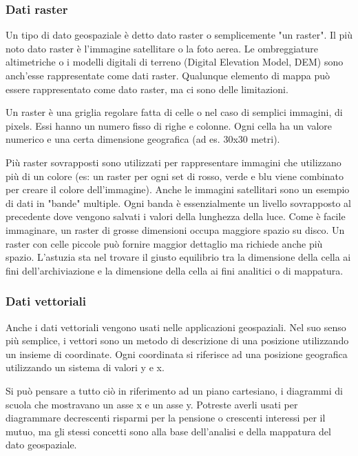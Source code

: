 \subsubsection{Dati raster}\label{label_rasterdata}

Un tipo di dato geospaziale è detto dato raster o semplicemente "un
raster". Il più noto dato raster è l'immagine satellitare o la foto
aerea. Le ombreggiature altimetriche o i modelli digitali di terreno (Digital Elevation Model, DEM)
sono anch'esse rappresentate come dati raster. Qualunque elemento di mappa può essere
rappresentato come dato raster, ma ci sono delle limitazioni.

Un raster è una griglia regolare fatta di celle o nel caso di semplici
immagini, di pixels. Essi hanno un numero fisso di righe e colonne.
Ogni cella ha un valore numerico e una certa dimensione geografica
(ad es. 30x30 metri).

Più raster sovrapposti sono utilizzati per rappresentare immagini che utilizzano
più di un colore (es: un raster per ogni set di rosso, verde e blu viene combinato
per creare il colore dell’immagine). Anche le immagini satellitari sono un esempio
di dati in "bande" multiple. Ogni banda è essenzialmente un livello sovrapposto
al precedente dove vengono salvati i valori della lunghezza della luce. Come è
facile immaginare, un raster di grosse dimensioni occupa maggiore spazio su disco.
Un raster con celle piccole può fornire maggior dettaglio ma richiede anche più spazio.
L'astuzia sta nel trovare il giusto equilibrio tra la dimensione della cella
ai fini dell'archiviazione e la dimensione della cella ai fini analitici
o di mappatura.

\subsubsection{Dati vettoriali}\label{label_vectordata}

Anche i dati vettoriali vengono usati nelle applicazioni geospaziali.
Nel suo senso più semplice, i vettori sono un metodo di descrizione
di una posizione utilizzando un insieme di coordinate. Ogni coordinata
si riferisce ad una posizione geografica utilizzando un sistema di valori y e x.

Si può pensare a tutto ciò in riferimento ad un piano cartesiano,
i diagrammi di scuola che mostravano un asse x e un asse y. Potreste
averli usati per diagrammare decrescenti risparmi per la pensione
o crescenti interessi per il mutuo, ma gli stessi concetti sono alla
base dell'analisi e della mappatura del dato geospaziale.

